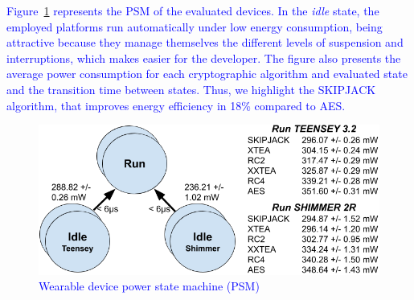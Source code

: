 \documentclass[journal]{IEEEtran}
\newcommand{\rever}{\textcolor{blue}}
\newcommand{\refazer}[1]{{\color{red}{[#1]}}}
\begin{document}

\rever{Figure~\ref{fig:PSM_geral} represents the PSM of the evaluated devices. In the {\em idle} state, the employed platforms run automatically under low energy consumption, being attractive because they manage themselves the different levels of suspension and interruptions, which makes easier for the developer. The figure also presents the average power consumption for each cryptographic algorithm and evaluated state and the transition time between states. Thus, we highlight the SKIPJACK algorithm, that improves energy efficiency in 18\% compared to AES.}


\begin{figure}[tbh]
 \vspace{-0.3cm}
 \centering
 \includegraphics[scale=0.3]{Figures/PSM_Geral.png}
 \caption{\rever{Wearable device power state machine (PSM)}}
 \label{fig:PSM_geral}
 \vspace{-0.3cm}
\end{figure}
\end{document}
